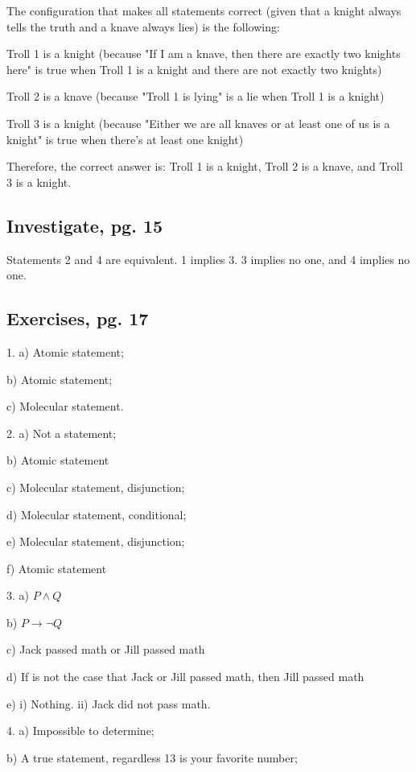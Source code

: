 \documentclass{article}
\begin{document}
  The configuration that makes all statements correct (given that a knight always tells the truth and a knave always lies) is the following:

  Troll 1 is a knight (because "If I am a knave, then there are exactly two knights here" is true when Troll 1 is a knight and there are not exactly two knights)

  Troll 2 is a knave (because "Troll 1 is lying" is a lie when Troll 1 is a knight)

  Troll 3 is a knight (because "Either we are all knaves or at least one of us is a knight" is true when there's at least one knight)

  Therefore, the correct answer is: Troll 1 is a knight, Troll 2 is a knave, and Troll 3 is a knight.

	\subsection{Investigate, pg. 15}

  Statements 2 and 4 are equivalent. 1 implies 3. 3 implies no one, and 4 implies no one. 

	\subsection{Exercises, pg. 17}

  1. a) Atomic statement;

  b) Atomic statement;

  c) Molecular statement.

  2. a) Not a statement;
  
  b) Atomic statement

  c) Molecular statement, disjunction;

  d) Molecular statement, conditional;

  e) Molecular statement, disjunction;

  f) Atomic statement

  3. a) $P \wedge Q$

  b) $P \rightarrow \neg Q$

  c) Jack passed math or Jill passed math

  d) If is not the case that Jack or Jill passed math, then Jill passed math

  e) i) Nothing. ii) Jack did not pass math.

  4. a) Impossible to determine;
  
  b) A true statement, regardless 13 is your favorite number;
\end{document}
